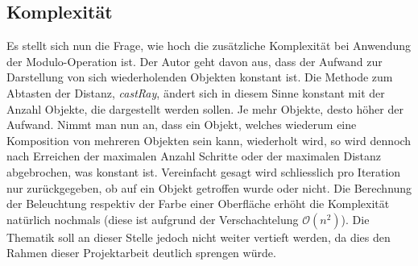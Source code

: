 
\subsection{Komplexität}
\label{subsec:rendering:modulo:complexity}

Es stellt sich nun die Frage, wie hoch die zusätzliche Komplexität bei
Anwendung der Modulo-Operation ist. Der Autor geht davon aus, dass der Aufwand
zur Darstellung von sich wiederholenden Objekten konstant ist. Die Methode zum
Abtasten der Distanz, \textit{castRay}, ändert sich in diesem Sinne konstant mit
der Anzahl Objekte, die dargestellt werden sollen. Je mehr Objekte, desto höher
der Aufwand. Nimmt man nun an, dass ein Objekt, welches wiederum eine
Komposition von mehreren Objekten sein kann, wiederholt wird, so wird dennoch
nach Erreichen der maximalen Anzahl Schritte oder der maximalen Distanz
abgebrochen, was konstant ist. Vereinfacht gesagt wird schliesslich pro Iteration
nur zurückgegeben, ob auf ein Objekt getroffen wurde oder nicht. Die Berechnung
der Beleuchtung respektiv der Farbe einer Oberfläche erhöht die Komplexität
natürlich nochmals (diese ist aufgrund der Verschachtelung
$\mathcal{O}(n^{2})$). Die Thematik soll an dieser Stelle jedoch nicht weiter
vertieft werden, da dies den Rahmen dieser Projektarbeit deutlich sprengen
würde.
